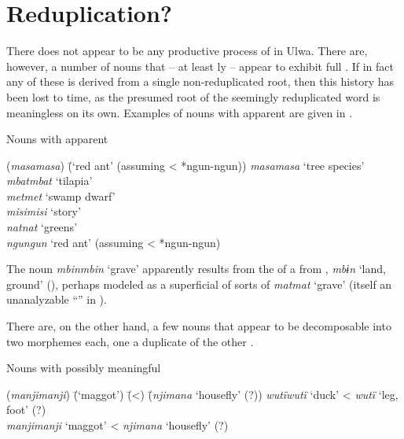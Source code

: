 \section{Reduplication?}\label{sec:3.4}


There does not appear to be any productive  process of  in Ulwa. There are, however, a number of nouns that -- at least ly -- appear to exhibit full . If in fact any of these is derived from a single non-reduplicated  root, then this history has been lost to time, as the presumed root of the seemingly reduplicated word is meaningless on its own. Examples of nouns with apparent  are given in .

\ea%
    \label{ex:nouns:46}
          Nouns with apparent \\
\begin{tabbing}
{(\textit{masamasa})} \= {(‘red ant’ (assuming < *ngun-ngun))}\kill
{\textit{masamasa}} \> {‘tree species’}\\
{\textit{mbatmbat}} \> {‘tilapia’}\\
{\textit{metmet}} \> {‘swamp dwarf’}\\
{\textit{misimisi}} \> {‘story’}\\
{\textit{natnat}} \> {‘greens’}\\
{\textit{ngungun}} \> {‘red ant’ (assuming < *ngun-ngun)}
\end{tabbing}
\z

The noun \textit{mbinmbin} ‘grave’ apparently results from the  of a  from , \textit{mbɨn} ‘land, ground’ (), perhaps modeled as a superficial  of sorts of  \textit{matmat} ‘grave’ (itself an unanalyzable “” in ).

There are, on the other hand, a few nouns that appear to be decomposable into two morphemes each, one a duplicate of the other .

  \ea%
    \label{ex:nouns:46a}
          Nouns with possibly meaningful \\
\begin{tabbing}
{(\textit{manjimanji})} \= {(‘maggot’)} \= {(<)} \= {(\textit{njimana} ‘housefly’ (?))}\kill
{\textit{wutïwutï}} \> {‘duck’} \> {<} \> {\textit{wutï} ‘leg, foot’ (?)}\\
{\textit{manjimanji}} \> {‘maggot’} \> {<} \> {\textit{njimana} ‘housefly’ (?)}
\end{tabbing}
\z
  
